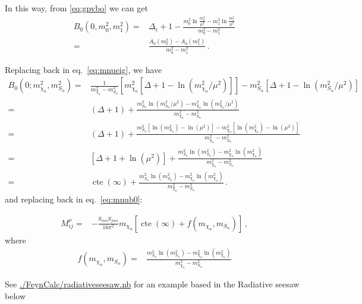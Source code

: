 In this way, from \eqref{eq:gpvbo} we can get
\begin{align}
  B_{0}\left(0, m_{0}^{2}, m_{1}^{2}\right)=&\Delta_{\epsilon}+1-\frac{m_{0}^{2} \ln \frac{m_{0}^{2}}{\mu^{2}}-m_{1}^{2} \ln \frac{m_{1}^{2}}{\mu^{2}}}{m_{0}^{2}-m_{1}^{2}} \nonumber\\
 =&\frac{A_{0}\left(m_{0}^{2}\right)-A_{0}\left(m_{1}^{2}\right)}{m_{0}^{2}-m_{1}^{2}}\,.
\end{align}


Replacing back in eq.~\eqref{eq:mnueig}, we have
\begin{align}
   B_0 \left(0;m_{\chi_n}^2,m^2_{S_{\alpha}} \right)=&
   \frac{1}{m_{\chi_n}^2-m_{S_\alpha}^2}\left[m^2_{\chi_n} \left[ \Delta+1-\ln \left( m_{\chi_n}^2/\mu^2 \right) \right]  \right] 
-m_{S_\alpha}^2 \left[ \Delta+1-\ln \left( m_{S_\alpha}^2/\mu^2 \right) \right] \nonumber\\
  =&(\Delta+1)+\frac{m_{S_\alpha}^2\ln \left( m_{S_\alpha}^2/\mu^2 \right)-m_{\chi_n}^2\ln \left( m_{\chi_n}^2/\mu^2 \right)}{m_{\chi_n}^2-m_{S_\alpha}^2} \nonumber\\
 =&(\Delta+1)+\frac{m_{S_\alpha}^2 \left[ \ln \left( m_{S_\alpha}^2 \right)-\ln \left( \mu^2 \right) \right]-
     m_{\chi_n}^2 \left[ \ln \left( m_{\chi_n}^2 \right)-\ln \left( \mu^2 \right) \right]}{m_{\chi_n}^2-m_{S_\alpha}^2} \nonumber\\  
=&\left[\Delta+1+\ln\left( \mu^2 \right) \right]+\frac{m_{S_\alpha}^2\ln \left( m_{S_\alpha}^2 \right)-m_{\chi_n}^2\ln \left( m_{\chi_n}^2 \right)}{m_{\chi_n}^2-m_{S_\alpha}^2} \nonumber\\
=&\operatorname{cte}(\infty)+\frac{m_{S_\alpha}^2\ln \left( m_{S_\alpha}^2 \right)-m_{\chi_n}^2\ln \left( m_{\chi_n}^2 \right)}{m_{\chi_n}^2-m_{S_\alpha}^2} \,.
\end{align}
and replacing back in eq.~\eqref{eq:mnub0}:

\begin{align}
 M^{\nu}_{ij}=&-\frac{y_{i n\alpha}y_{j n\alpha}}{16\pi^2}m_{\chi_n} \left[ \operatorname{cte}(\infty)+
f \left( m_{\chi_n},m_{S_{\alpha}} \right) \right] \,,
\end{align}
where
\begin{align}
f \left( m_{\chi_n},m_{S_{\alpha}} \right)=&  
\frac{m_{S_{\alpha}}^2\ln \left(m_{S_{\alpha}}^2\right)-m_{\chi_n}^2\ln \left(m_{\chi_n}^2  \right)}{m_{\chi_n}^2-m_{S_{\alpha}}^2}
\end{align}

See \url{./FeynCalc/radiativeseesaw.nb} for an example based in the Radiative seesaw below

